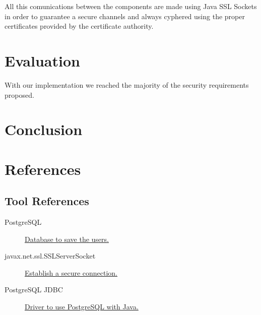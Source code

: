 \documentclass[a4paper,titlepage,11pt]{article}
\begin{document}
All this comunications between the components are made using Java SSL Sockets in order to guarantee a secure channels and
always cyphered using the proper certificates provided by the certificate authority.

\section{Evaluation}
With our implementation we reached the majority of the security requirements proposed.

\section{Conclusion}

\section{References}

\subsection{Tool References}
\begin{description}
  \item [PostgreSQL] \href{https://www.postgresql.org}{Database to save the users.}
  \item [javax.net.ssl.SSLServerSocket] \href{https://docs.oracle.com/javase/7/docs/api/java/net/Socket.html}{Establish a secure connection.}
  \item [PostgreSQL JDBC] \href{https://jdbc.postgresql.org}{Driver to use PostgreSQL with Java.}
\end{description}
\end{document}
